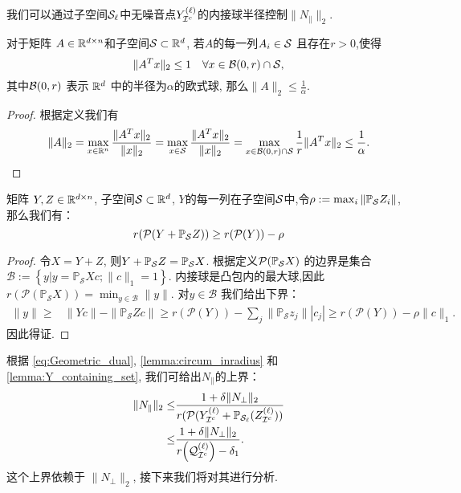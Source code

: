 我们可以通过子空间\(\mathcal{S}_\ell\)中无噪音点\(Y^{(\ell)}_{\mathcal{I}^c}\)的内接球半径控制\(\|N_{\parallel}\|_2\).
\begin{lemma}\label{lemma:circum_inradius}
  对于矩阵 \(A \in \mathbb{R}^{d \times n}\)和子空间\(\mathcal{S}\subset \mathbb{R}^d\), 
  若\(A\)的每一列\(A_i \in \mathcal{S}\) 且存在\(r>0\),使得
  \[\|A^Tx\|_2 \leq 1 \quad \forall x \in \mathcal{B}(0, r)\cap \mathcal{S},\]
  其中\(\mathcal{B}(0, r)\) 表示 \(\mathbb{R}^d\) 中的半径为\(\alpha\)的欧式球,
  那么\(\|A\|_2 \leq \frac{1}{\alpha}\).
\end{lemma}
\begin{proof}
  根据定义我们有
  \begin{align*}
    \|A\|_2 = \max_{x\in \mathbb{R}^n} \frac{\|A^Tx\|_2}{\|x\|_2}
    = \max_{x \in \mathcal{S}} \frac{\|A^Tx\|_2}{\|x\|_2}
    = \max_{x \in \mathcal{B}(0,r) \cap \mathcal{S}} \frac{1}{r} \|A^Tx\|_2
    \leq \frac{1}{\alpha}.
  \end{align*}
\end{proof}

\begin{lemma}\label{lemma:Y_containing_set}
  矩阵 \(Y, Z\in \mathbb{R}^{d \times n}\), 子空间\(\mathcal{S} \subset \mathbb{R}^d\),
  \(Y\)的每一列在子空间\(\mathcal{S}\)中,令\(\rho:=\max_{i}\|\mathbb{P}_{\mathcal{S}} Z_i\|\),
  那么我们有：
  \begin{equation*}
    r(\mathcal{P}(Y+\mathbb{P}_{\mathcal{S}} Z)) \geq r(\mathcal{P}(Y)) - \rho
  \end{equation*}
\end{lemma}
\begin{proof}
  令\(X=Y+Z\), 则\(Y+\mathbb{P}_{\mathcal{S}} Z=\mathbb{P}_{\mathcal{S}} X\). 根据定义\(\mathcal{P}(\mathbb{P}_{\mathcal{S}} X)\) 的边界是集合 \(\mathcal{B}:=
  \left\{y|y=\mathbb{P}_\mathcal{S} X c; \|c\|_1=1\right\}\).
  内接球是凸包内的最大球,因此 \(r(\mathcal{P}(\mathbb{P}_\mathcal{S} X)) =
  \min_{y\in \mathcal{B}} \|y\|\). 对\(y \in \mathcal{B} \) 我们给出下界：
  \begin{align*}
    \|y\| \geq& \|Yc\|-\|\mathbb{P}_\mathcal{S}Z c\|\geq r(\mathcal{P}(Y)) - {\sum}_j{\|\mathbb{P}_\mathcal{S}z_j}\||c_j|
    \geq r(\mathcal{P}(Y)) - \rho\|c\|_1.
  \end{align*}
  因此得证.
\end{proof}

根据 \eqref{eq:Geometric_dual},   \autoref{lemma:circum_inradius} 和\autoref{lemma:Y_containing_set},  
我们可给出\(N_{\parallel}\)的上界：
\begin{align}
  \|N_{\parallel}\|_2 \leq& \frac{1+\delta\|N_{\perp}\|_2}
  {r(\mathcal{P}(Y_{\mathcal{I}^c}^{(\ell)}+\mathbb{P}_{\mathcal{S}_{\ell}}(Z_{\mathcal{I}^c}^{(\ell)}))}
  \nonumber \\
  \leq& \frac{1+\delta\|N_{\perp}\|_2}{r{\left( \mathcal{Q}_{\mathcal{I}^c}^{(\ell)}\right)}-\delta_1}.\label{eq:nu1_bound}
\end{align}
这个上界依赖于 \(\|N_{\perp}\|_2\), 接下来我们将对其进行分析.

